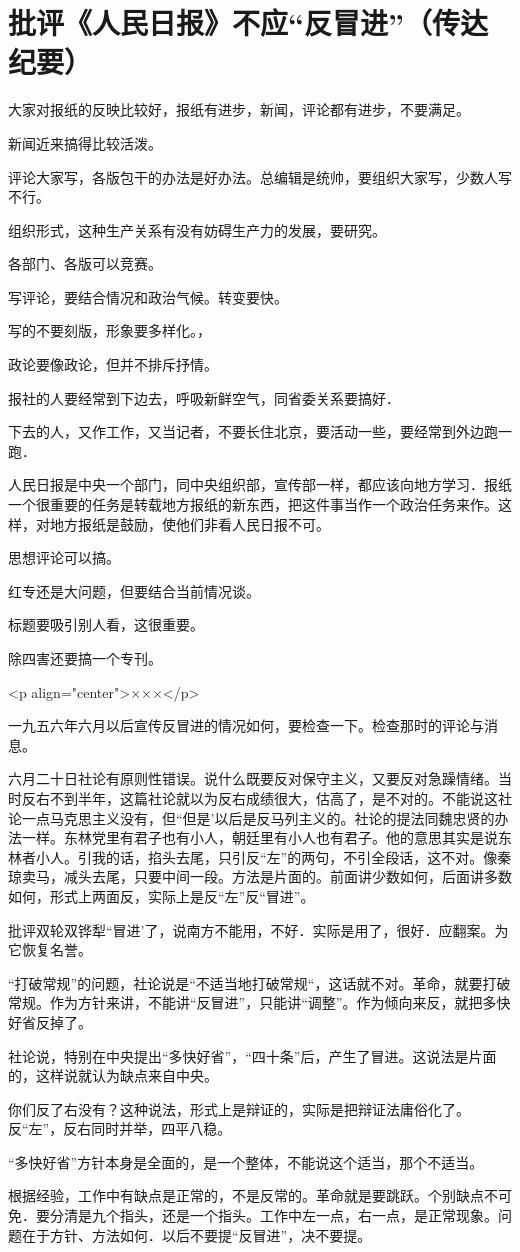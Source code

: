 \section[批评《人民日报》不应“反冒进”（传达纪要）（一九五八年一月）]{批评《人民日报》不应“反冒进”（传达纪要）}


大家对报纸的反映比较好，报纸有进步，新闻，评论都有进步，不要满足。

新闻近来搞得比较活泼。

评论大家写，各版包干的办法是好办法。总编辑是统帅，要组织大家写，少数人写不行。

组织形式，这种生产关系有没有妨碍生产力的发展，要研究。

各部门、各版可以竞赛。

写评论，要结合情况和政治气候。转变要快。

写的不要刻版，形象要多样化。，

政论要像政论，但并不排斥抒情。

报社的人要经常到下边去，呼吸新鲜空气，同省委关系要搞好．

下去的人，又作工作，又当记者，不要长住北京，要活动一些，要经常到外边跑一跑．

人民日报是中央一个部门，同中央组织部，宣传部一样，都应该向地方学习．报纸一个很重要的任务是转载地方报纸的新东西，把这件事当作一个政治任务来作。这样，对地方报纸是鼓励，使他们非看人民日报不可。

思想评论可以搞。

红专还是大问题，但要结合当前情况谈。

标题要吸引别人看，这很重要。

除四害还要搞一个专刊。

<p align="center">×××</p>

一九五六年六月以后宣传反冒进的情况如何，要检查一下。检查那时的评论与消息。

六月二十日社论有原则性错误。说什么既要反对保守主义，又要反对急躁情绪。当时反右不到半年，这篇社论就以为反右成绩很大，估高了，是不对的。不能说这社论一点马克思主义没有，但“但是’以后是反马列主义的。社论的提法同魏忠贤的办法一样。东林党里有君子也有小人，朝廷里有小人也有君子。他的意思其实是说东林者小人。引我的话，掐头去尾，只引反“左”的两句，不引全段话，这不对。像秦琼卖马，减头去尾，只要中间一段。方法是片面的。前面讲少数如何，后面讲多数如何，形式上两面反，实际上是反“左”反“冒进”。

批评双轮双铧犁“冒进’了，说南方不能用，不好．实际是用了，很好．应翻案。为它恢复名誉。

“打破常规”的问题，社论说是“不适当地打破常规“，这话就不对。革命，就要打破常规。作为方针来讲，不能讲“反冒进”，只能讲“调整”。作为倾向来反，就把多快好省反掉了。

社论说，特别在中央提出“多快好省”，“四十条”后，产生了冒进。这说法是片面的，这样说就认为缺点来自中央。

你们反了右没有？这种说法，形式上是辩证的，实际是把辩证法庸俗化了。反“左”，反右同时并举，四平八稳。

“多快好省”方针本身是全面的，是一个整体，不能说这个适当，那个不适当。

根据经验，工作中有缺点是正常的，不是反常的。革命就是要跳跃。个别缺点不可免．要分清是九个指头，还是一个指头。工作中左一点，右一点，是正常现象。问题在于方针、方法如何．以后不要提“反冒进”，决不要提。


